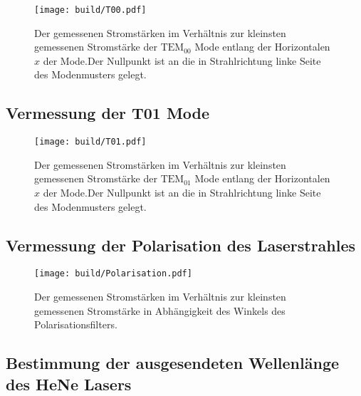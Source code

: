 \begin{figure}
	\centering
	\texttt{[image: build/T00.pdf]}
	\caption{Der gemessenen Stromstärken im Verhältnis zur kleinsten gemessenen Stromstärke der $\text{TEM}_{00}$ Mode entlang der Horizontalen $x$ der Mode.Der Nullpunkt ist an die in Strahlrichtung linke Seite des Modenmusters gelegt.}
	\label{fig:T00}
\end{figure}



\subsection{Vermessung der T01 Mode}



\begin{figure}
	\centering
	\texttt{[image: build/T01.pdf]}
	\caption{Der gemessenen Stromstärken im Verhältnis zur kleinsten gemessenen Stromstärke der $\text{TEM}_{01}$ Mode entlang der Horizontalen $x$ der Mode.Der Nullpunkt ist an die in Strahlrichtung linke Seite des Modenmusters gelegt.}
	\label{fig:T01}
\end{figure}



\subsection{Vermessung der Polarisation des Laserstrahles}


\begin{figure}
	\centering
	\texttt{[image: build/Polarisation.pdf]}
	\caption{Der gemessenen Stromstärken im Verhältnis zur kleinsten gemessenen Stromstärke in Abhängigkeit des Winkels des Polarisationsfilters.}
	\label{fig:polarisation}
\end{figure}




\subsection{Bestimmung der ausgesendeten Wellenlänge des HeNe Lasers}




